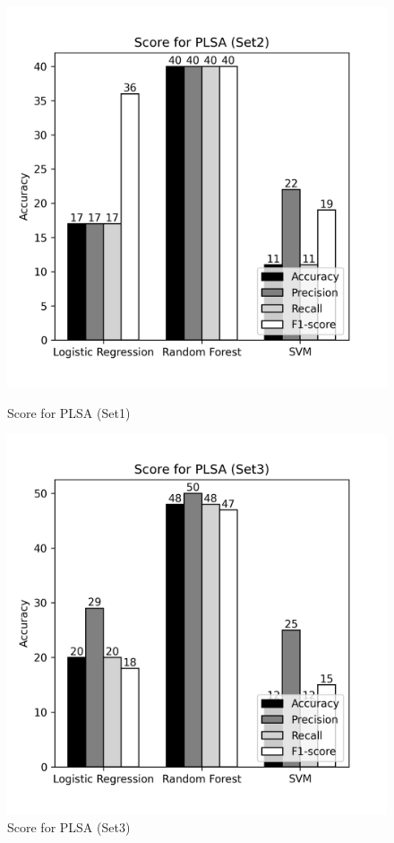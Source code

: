 \documentclass[12pt]{report}
\begin{document}
             \begin{figure}[!htb]
                \begin{minipage}{0.48\textwidth}
                  \centering
                  \includegraphics[scale=0.55]{plots/Score for PLSA (Set2).png}
                  \caption{Score for PLSA (Set1)}\label{Fig:typo1}
                \end{minipage}\hfill
                \begin{minipage}{0.48\textwidth}
                  \centering
                  \includegraphics[scale=0.55]{plots/Score for PLSA (Set3).png}
                  \caption{Score for PLSA (Set3)}\label{Fig:typo2}
                \end{minipage}
             \end{figure}
\end{document}
